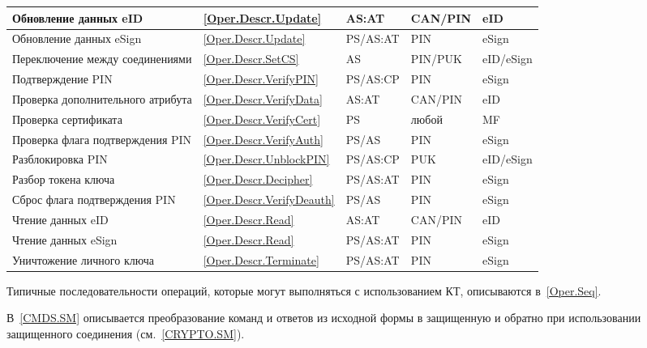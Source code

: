 \begin{table}[p]
\begin{tabular}{|p{7.5cm}|p{1.3cm}|p{2.6cm}|p{1.8cm}| p{1.7cm}|}
\hline
Обновление данных eID & \ref{Oper.Descr.Update} & AS:AT & CAN/PIN & eID \\
\hline
Обновление данных eSign & \ref{Oper.Descr.Update} & PS/AS:AT & PIN & eSign \\
\hline
Переключение между соединениями & \ref{Oper.Descr.SetCS} & AS & PIN/PUK & 
eID/eSign \\ 
\hline
Подтверждение PIN & \ref{Oper.Descr.VerifyPIN} & PS/AS:CP & PIN & eSign \\
\hline
Проверка дополнительного атрибута& \ref{Oper.Descr.VerifyData}& AS:AT & CAN/PIN 
& eID \\ 
\hline
Проверка сертификата & \ref{Oper.Descr.VerifyCert} & PS & любой & MF \\
\hline
Проверка флага подтверждения PIN & \ref{Oper.Descr.VerifyAuth} & PS/AS & PIN 
& eSign \\ 
\hline
Разблокировка PIN & \ref{Oper.Descr.UnblockPIN} & PS/AS:CP  & PUK & eID/eSign\\ 
\hline
Разбор токена ключа & 
\ref{Oper.Descr.Decipher} & PS/AS:AT & PIN & eSign \\
\hline
Сброс флага подтверждения PIN & \ref{Oper.Descr.VerifyDeauth} & 
PS/AS & PIN & eSign \\ 
\hline
Чтение данных eID & \ref{Oper.Descr.Read} & AS:AT & CAN/PIN & eID \\
\hline
Чтение данных eSign & \ref{Oper.Descr.Read} & PS/AS:AT& PIN & eSign \\
\hline
Уничтожение личного ключа & \ref{Oper.Descr.Terminate} & PS/AS:AT  & PIN & eSign \\
\hline
\end{tabular}
\end{table}

Типичные последовательности операций, которые могут выполняться 
с использованием КТ, описываются в~\ref{Oper.Seq}.

В~\ref{CMDS.SM} описывается преобразование команд и ответов из исходной формы в 
защищенную и обратно при использовании защищенного соединения (см.~\ref{CRYPTO.SM}). 


